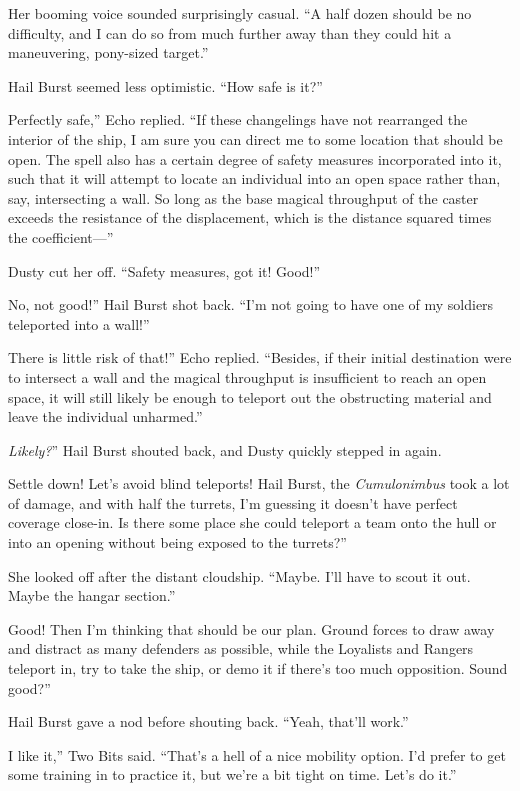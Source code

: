 Her booming voice sounded surprisingly casual. “A half dozen should be no difficulty, and I can do so from much further away than they could hit a maneuvering, pony-sized target.”

Hail Burst seemed less optimistic. “How safe is it?”

\leavevmode{}Perfectly safe,” Echo replied. “If these changelings have not rearranged the interior of the ship, I am sure you can direct me to some location that should be open. The spell also has a certain degree of safety measures incorporated into it, such that it will attempt to locate an individual into an open space rather than, say, intersecting a wall. So long as the base magical throughput of the caster exceeds the resistance of the displacement, which is the distance squared times the coefficient—”

Dusty cut her off. “Safety measures, got it! Good!”

\leavevmode{}No, not good!” Hail Burst shot back. “I’m not going to have one of my soldiers teleported into a wall!”

\leavevmode{}There is little risk of that!” Echo replied. “Besides, if their initial destination were to intersect a wall and the magical throughput is insufficient to reach an open space, it will still likely be enough to teleport out the obstructing material and leave the individual unharmed.”

\leavevmode{}\textit{Likely?}” Hail Burst shouted back, and Dusty quickly stepped in again.

\leavevmode{}Settle down! Let’s avoid blind teleports! Hail Burst, the \textit{Cumulonimbus} took a lot of damage, and with half the turrets, I’m guessing it doesn’t have perfect coverage close-in. Is there some place she could teleport a team onto the hull or into an opening without being exposed to the turrets?”

She looked off after the distant cloudship. “Maybe. I’ll have to scout it out. Maybe the hangar section.”

\leavevmode{}Good! Then I’m thinking that should be our plan. Ground forces to draw away and distract as many defenders as possible, while the Loyalists and Rangers teleport in, try to take the ship, or demo it if there’s too much opposition. Sound good?”

Hail Burst gave a nod before shouting back. “Yeah, that’ll work.”

\leavevmode{}I like it,” Two Bits said. “That’s a hell of a nice mobility option. I’d prefer to get some training in to practice it, but we’re a bit tight on time. Let’s do it.”

